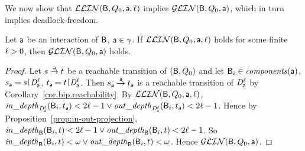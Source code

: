 


\vspace{0.5ex}

\noindent
We now show that $\mathcal{LLIN}(\mathsf{B}, Q_0, \mathsf{a}, \ell)$ implies $\mathcal{GLIN}(\mathsf{B}, Q_0, \mathsf{a})$, which in turn implies deadlock-freedom.  

\begin{lemma}
\label{lemma:loc-implies-glob}
\label{lemma:locLinear-implies-globlinear}
\label{LLinGLin}
Let $\mathsf{a}$ be an interaction of $\mathsf{B}$, \ie $\mathsf{a} \in \gamma$.
If $\mathcal{LLIN}(\mathsf{B}, Q_0, \mathsf{a}, \ell)$ holds for some finite $\ell > 0$, then $\mathcal{GLIN}(\mathsf{B}, Q_0, \mathsf{a})$ holds.
\end{lemma}
%
%
\begin{proof}
Let $s \stackrel{\mathsf{a}}{\rightarrow} t$ be a reachable transition of $(\mathsf{B}, Q_0)$ and let 
$\mathsf{B}_i \in \mathit{components}(\mathsf{a})$, $s_\act = s \pj \dsk{\act}{\l}$, $t_\act = t \pj \dsk{\act}{\l}$.
Then $s_{\mathsf{a}} \stackrel{\mathsf{a}}{\rightarrow} t_{\mathsf{a}}$ is a reachable transition of $\mathit{D}_{\mathsf{a}}^{\ell}$ by Corollary~\ref{cor.bip.reachability}.
By $\mathcal{LLIN}(\mathsf{B}, Q_0, \mathsf{a}, \ell)$, 
$\mathit{in\_depth}_{\mathit{D}_{\mathsf{a}}^{\ell}}({\mathsf{B}_i, t_{\mathsf{a}}}) < 2\ell-1 \lor \mathit{out\_depth}_{\mathit{D}_{\mathsf{a}}^{\ell}}({\mathsf{B}_i, t_{\mathsf{a}}}) < 2\ell-1$.
Hence by Proposition~\ref{prop:in-out-projection},
$\mathit{in\_depth}_{\mathsf{B}}({\mathsf{B}_i, t}) < 2\ell-1 \lor \mathit{out\_depth}_{\mathsf{B}}({\mathsf{B}_i, t}) < 2\ell-1$.
So
$\mathit{in\_depth}_{\mathsf{B}}({\mathsf{B}_i, t}) < \omega \lor \mathit{out\_depth}_{\mathsf{B}}({\mathsf{B}_i, t}) < \omega$.
Hence $\mathcal{GLIN}(\mathsf{B}, Q_0, \mathsf{a})$.
\end{proof}







